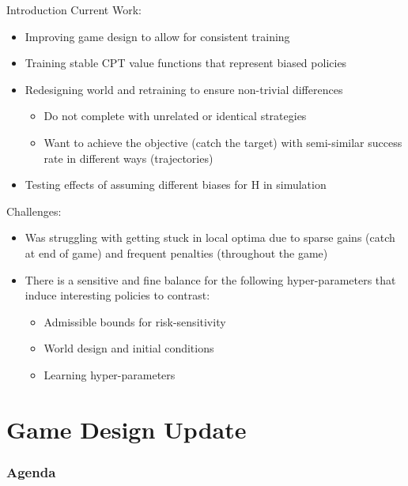 \documentclass[aspectratio=1610, xcolor=dvipsnames]{packages/beamer}
\newcommand{\displayTOC}{\begin{frame}\frametitle{Agenda} \tableofcontents[currentsection, subsectionstyle=show/show/hide]\end{frame}}
\begin{document}
\begin{frame}{Introduction}
    Current Work:
    \begin{itemize}
        \item Improving game design to allow for consistent training
        \item Training stable CPT value functions that represent biased policies
        \item Redesigning world and retraining to ensure non-trivial differences
        \begin{itemize}
            \item Do not complete with unrelated or identical strategies
            \item Want to achieve the objective (catch the target) with semi-similar success rate in different ways (trajectories)
        \end{itemize}
        \item Testing effects of assuming different biases for H in simulation
    \end{itemize}
    Challenges: \begin{itemize}
        \item Was struggling with getting stuck in local optima due to sparse gains (catch at end of game) and frequent penalties (throughout the game)

        \item There is a sensitive and fine balance for the following hyper-parameters that induce interesting policies to contrast:
        \begin{itemize}
            \item Admissible bounds for risk-sensitivity
            \item World design and initial conditions
            \item Learning hyper-parameters
        \end{itemize}
    \end{itemize}

\end{frame}

\section{Game Design Update} \displayTOC
\end{document}
